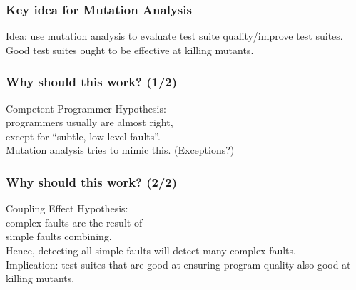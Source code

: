 \documentclass{beamer}
\newenvironment{changemargin}[1]{%
  \begin{list}{}{%
    \setlength{\topsep}{0pt}%
    \setlength{\leftmargin}{#1}%
    \setlength{\rightmargin}{1em}
    \setlength{\listparindent}{\parindent}%
    \setlength{\itemindent}{\parindent}%
    \setlength{\parsep}{\parskip}%
  }%
  \item[]}{\end{list}}
\begin{document}
\begin{frame}
  \frametitle{Key idea for Mutation Analysis}
  \Large
  \begin{changemargin}{2em}
    Idea: use mutation analysis to evaluate test suite quality/improve test suites.\\[1em]
    Good test suites ought to be effective at killing mutants.
  \end{changemargin}

\end{frame}


\begin{frame}
  \frametitle{Why should this work? (1/2)}

    \Large
    \begin{changemargin}{2em}
      \alert{Competent Programmer Hypothesis}: \\
      \hspace*{2em}programmers usually are almost right,\\
      \hspace*{2em}except for ``subtle, low-level faults''.\\[1em]
      Mutation analysis tries to mimic this. (Exceptions?)
  \end{changemargin}

\end{frame}

\begin{frame}
  \frametitle{Why should this work? (2/2)}

    \Large
    \begin{changemargin}{2em}
      \alert{Coupling Effect Hypothesis}: \\
      \hspace*{2em}complex faults are the result of \\
      \hspace*{2em} simple faults combining.\\[1em]
      Hence, detecting all simple faults will detect many complex faults.\\[2em]

      Implication: test suites that are good at ensuring program quality also good at killing mutants.
      
  \end{changemargin}

\end{frame}
\end{document}
